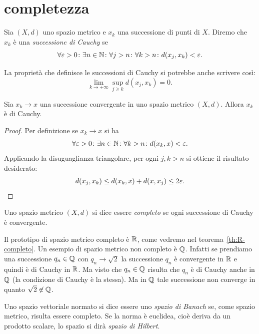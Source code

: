 \section{completezza}

\begin{definition}
\mymark{***}
Sia $(X,d)$ uno spazio metrico e $x_k$ una successione di punti di $X$.
Diremo che $x_k$ è una
\emph{successione di Cauchy}
se
\[
 \forall \varepsilon>0\colon \exists n\in {\mathbb N}\colon \forall j>n \colon \forall k > n \colon d(x_j,x_k) < \varepsilon.
\]
\end{definition}

La proprietà che definisce le successioni di Cauchy
si potrebbe anche scrivere così:
\[
  \lim_{k \to +\infty} \sup_{j\ge k} d(x_j, x_k) = 0.
\]

\begin{theorem}
\mymark{**}%
\label{th:se_converge_cauchy}
Sia $x_k\to x$ una successione convergente in uno spazio metrico $(X,d)$. Allora $x_k$ è di Cauchy.
\end{theorem}
%
\begin{proof}
\mymark{**}
Per definizione se $x_k \to x$ si ha
\[
  \forall \varepsilon>0\colon \exists n\in {\mathbb N} \colon
  \forall k>n \colon d(x_k,x)< \varepsilon.
\]
Applicando la disuguaglianza triangolare, per ogni $j,k>n$
si ottiene il risultato desiderato:
\[
  d(x_j, x_k) \le d(x_k,x) + d(x,x_j) \le 2\varepsilon.
\]
\end{proof}

\begin{definition}[completezza]
\mymark{***}
Uno spazio metrico $(X,d)$ si dice essere \emph{completo}%
se ogni successione di Cauchy è convergente.
\end{definition}

Il prototipo di spazio metrico completo è ${\mathbb R}$, come vedremo nel teorema~\ref{th:R-completo}.
Un esempio di spazio metrico non completo è ${\mathbb Q}$.
Infatti se prendiamo una
successione $q_n \in{\mathbb Q}$ con $q_n\to \sqrt 2$ la successione $q_n$ è convergente
in ${\mathbb R}$ e quindi è di Cauchy in ${\mathbb R}$. Ma visto che $q_n\in {\mathbb Q}$ risulta
che $q_n$ è di Cauchy anche in ${\mathbb Q}$ (la condizione di Cauchy è la stessa).
Ma in ${\mathbb Q}$ tale successione non converge in quanto $\sqrt 2\not \in {\mathbb Q}$.

\begin{definition}
Uno spazio vettoriale normato si dice essere uno
\emph{spazio di Banach}%
%
%
se, come spazio metrico, risulta essere completo.
Se la norma è euclidea, cioè deriva da un prodotto scalare, lo spazio si dirà
\emph{spazio di Hilbert}.
%
\end{definition}

